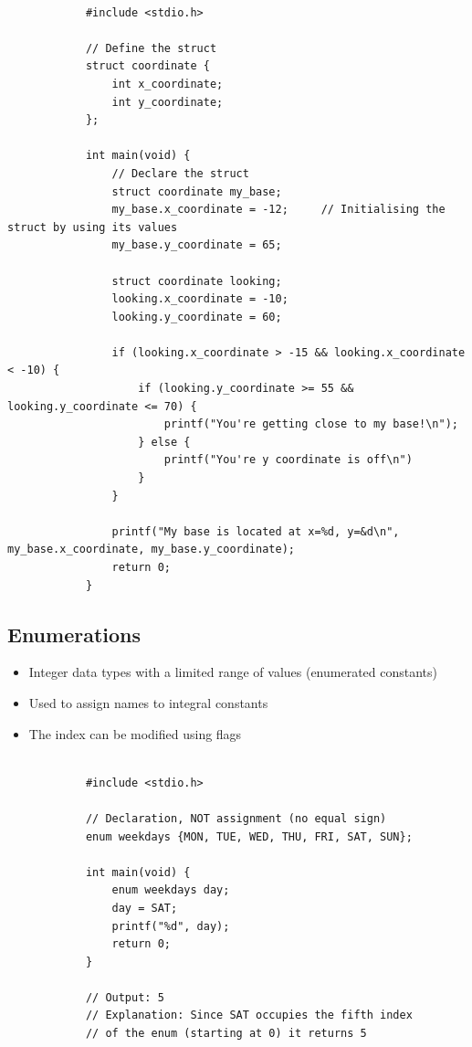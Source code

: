 \documentclass{article}
\begin{document}
		\begin{verbatim}
				
			#include <stdio.h>

			// Define the struct
			struct coordinate {
				int x_coordinate;
				int y_coordinate;
			};

			int main(void) {
				// Declare the struct
				struct coordinate my_base;
				my_base.x_coordinate = -12;		// Initialising the struct by using its values
				my_base.y_coordinate = 65;

				struct coordinate looking;
				looking.x_coordinate = -10;
				looking.y_coordinate = 60;

				if (looking.x_coordinate > -15 && looking.x_coordinate < -10) {
					if (looking.y_coordinate >= 55 && looking.y_coordinate <= 70) {
						printf("You're getting close to my base!\n");
					} else {
						printf("You're y coordinate is off\n")
					}
				}

				printf("My base is located at x=%d, y=&d\n", my_base.x_coordinate, my_base.y_coordinate);
				return 0;
			}

		\end{verbatim}

	\subsection{Enumerations}

		\begin{itemize}
			\item Integer data types with a limited range of values (enumerated constants)
			\item Used to assign names to integral constants
			\item The index can be modified using flags
		\end{itemize}

		\begin{verbatim}
			
			#include <stdio.h>

			// Declaration, NOT assignment (no equal sign)
			enum weekdays {MON, TUE, WED, THU, FRI, SAT, SUN};

			int main(void) {
				enum weekdays day;
				day = SAT;
				printf("%d", day);
				return 0;
			}

			// Output: 5
			// Explanation: Since SAT occupies the fifth index
			// of the enum (starting at 0) it returns 5

		\end{verbatim}
\end{document}
